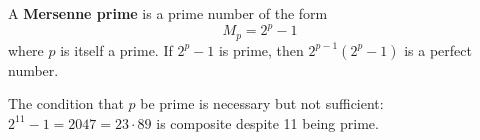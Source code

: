 A \textbf{Mersenne prime} is a prime number of the form
$$M_p = 2^p - 1$$
where $p$ is itself a prime. If $2^p - 1$ is prime, then $2^{p-1}(2^p - 1)$ is a perfect number.

The condition that $p$ be prime is necessary but not sufficient: $2^{11} - 1 = 2047 = 23 \cdot 89$ is composite despite 11 being prime.
